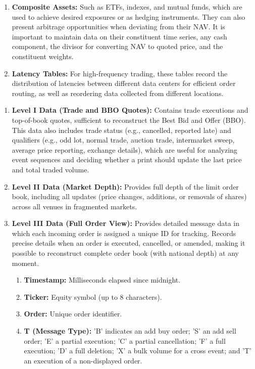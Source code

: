\begin{definition}
\begin{enumerate}[label=\roman*.]
\item \textbf{Composite Assets:} Such as ETFs, indexes, and mutual funds, which are used to achieve desired exposures or as hedging instruments. They can also present arbitrage opportunities when deviating from their NAV. It is important to maintain data on their constituent time series, any cash component, the divisor for converting NAV to quoted price, and the constituent weights.
\item \textbf{Latency Tables:} For high-frequency trading, these tables record the distribution of latencies between different data centers for efficient order routing, as well as reordering data collected from different locations.
\end{enumerate}
\end{definition}

\begin{definition} 
\begin{enumerate}[label=\roman*.]
\setlength{\itemsep}{0pt}
\item \textbf{Level I Data (Trade and BBO Quotes):} Contains trade executions and top-of-book quotes, sufficient to reconstruct the Best Bid and Offer (BBO). This data also includes trade status (e.g., cancelled, reported late) and qualifiers (e.g., odd lot, normal trade, auction trade, intermarket sweep, average price reporting, exchange details), which are useful for analyzing event sequences and deciding whether a print should update the last price and total traded volume.
\item \textbf{Level II Data (Market Depth):} Provides full depth of the limit order book, including all updates (price changes, additions, or removals of shares) across all venues in fragmented markets.
\item \textbf{Level III Data (Full Order View):} Provides detailed message data in which each incoming order is assigned a unique ID for tracking. Records precise details when an order is executed, cancelled, or amended, making it possible to reconstruct complete order book (with national depth) at any moment.
\begin{enumerate}[label=\arabic*.]
\setlength{\itemsep}{0pt}
\item \textbf{Timestamp:} Milliseconds elapsed since midnight.
\item \textbf{Ticker:} Equity symbol (up to 8 characters).
\item \textbf{Order:} Unique order identifier.
\item \textbf{T (Message Type):} 'B' indicates an add buy order; 'S' an add sell order; 'E' a partial execution; 'C' a partial cancellation; 'F' a full execution; 'D' a full deletion; 'X' a bulk volume for a cross event; and 'T' an execution of a non-displayed order.

\end{enumerate}
\end{enumerate}
\end{definition}
